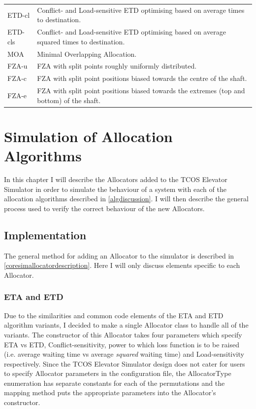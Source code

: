 \documentclass{UoYCSproject}
\begin{document}
\begin{tabularx}{\linewidth}{l X}
	ETD-cl		& Conflict- and Load-sensitive ETD optimising based on average times to destination. \\
	ETD-cls		& Conflict- and Load-sensitive ETD optimising based on average squared times to destination. \\
	MOA			& Minimal Overlapping Allocation. \\
	FZA-u		& FZA with split points roughly uniformly distributed. \\
	FZA-c		& FZA with split point positions biased towards the centre of the shaft. \\
	FZA-e		& FZA with split point positions biased towards the extremes (top and bottom) of the shaft.
\end{tabularx}

\chapter{Simulation of Allocation Algorithms}
\label{algsimulation}

In this chapter I will describe the Allocators added to the TCOS Elevator Simulator in order to simulate the behaviour of a system with each of the allocation algorithms described in \autoref{algdiscussion}.  I will then describe the general process used to verify the correct behaviour of the new Allocators.

\section{Implementation}

The general method for adding an Allocator to the simulator is described in \autoref{coresimallocatordescription}.  Here I will only discuss elements specific to each Allocator.

\subsection{ETA and ETD}

Due to the similarities and common code elements of the ETA and ETD algorithm variants, I decided to make a single Allocator class to handle all of the variants.  The constructor of this Allocator takes four parameters which specify ETA vs ETD, Conflict-sensitivity, power to which loss function is to be raised (i.e. average waiting time vs average \textit{squared} waiting time) and Load-sensitivity respectively.  Since the TCOS Elevator Simulator design does not cater for users to specify Allocator parameters in the configuration file, the AllocatorType enumeration has separate constants for each of the permutations and the mapping method puts the appropriate parameters into the Allocator's constructor.
\end{document}
